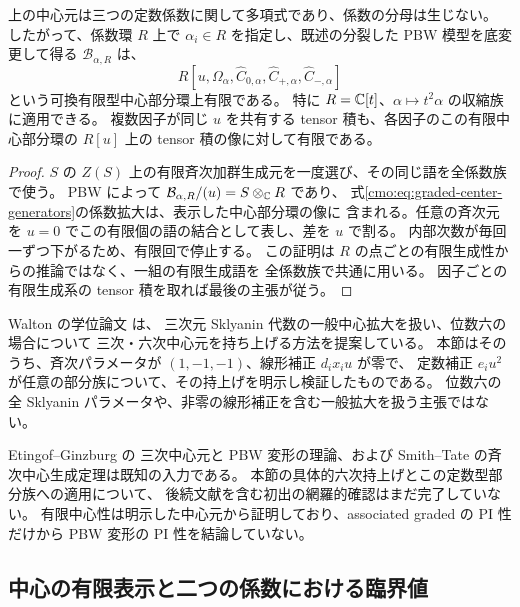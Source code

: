 \begin{corollary}[係数族に一様な有限中心模型]
\label{cmo:cor:relative-finite-center}
上の中心元は三つの定数係数に関して多項式であり、係数の分母は生じない。
したがって、係数環 $R$ 上で $\alpha_i\in R$ を指定し、既述の分裂した
PBW 模型を底変更して得る $\mathcal B_{\alpha,R}$ は、
\[
 R[u,\Omega_\alpha,
       \widehat C_{0,\alpha},\widehat C_{+,\alpha},\widehat C_{-,\alpha}]
\]
という可換有限型中心部分環上有限である。
特に $R=\mathbb C[t]$、$\alpha\mapsto t^2\alpha$ の収縮族に適用できる。
複数因子が同じ $u$ を共有する tensor 積も、各因子のこの有限中心部分環の
$R[u]$ 上の tensor 積の像に対して有限である。
\end{corollary}

\begin{proof}
$S$ の $Z(S)$ 上の有限斉次加群生成元を一度選び、その同じ語を全係数族で使う。
PBW によって $\mathcal B_{\alpha,R}/(u)=S\otimes_\mathbb C R$ であり、
式\eqref{cmo:eq:graded-center-generators}の係数拡大は、表示した中心部分環の像に
含まれる。任意の斉次元を $u=0$ でこの有限個の語の結合として表し、差を $u$ で割る。
内部次数が毎回一ずつ下がるため、有限回で停止する。
この証明は $R$ の点ごとの有限生成性からの推論ではなく、一組の有限生成語を
全係数族で共通に用いる。
因子ごとの有限生成系の tensor 積を取れば最後の主張が従う。
\end{proof}

\begin{remark}[先行研究との関係と新規性の範囲]
\label{cmo:rem:pi-center-literature}
Walton の学位論文 \cite[Definition~V.1, Remark~V.16]{CMOWaltonThesis} は、
三次元 Sklyanin 代数の一般中心拡大を扱い、位数六の場合について
三次・六次中心元を持ち上げる方法を提案している。
本節はそのうち、斉次パラメータが $(1,-1,-1)$、線形補正 $d_i x_i u$ が零で、
定数補正 $e_i u^2$ が任意の部分族について、その持上げを明示し検証したものである。
位数六の全 Sklyanin パラメータや、非零の線形補正を含む一般拡大を扱う主張ではない。

Etingof--Ginzburg \cite[Theorem~3.3.2 and Section~9]{NFMEG} の
三次中心元と PBW 変形の理論、および Smith--Tate の斉次中心生成定理は既知の入力である。
本節の具体的六次持上げとこの定数型部分族への適用について、
後続文献を含む初出の網羅的確認はまだ完了していない。
有限中心性は明示した中心元から証明しており、associated graded の PI 性だけから
PBW 変形の PI 性を結論していない。
\end{remark}

\subsection{中心の有限表示と二つの係数における臨界値}
\label{cmo:subsec:effective-center-geometry}

